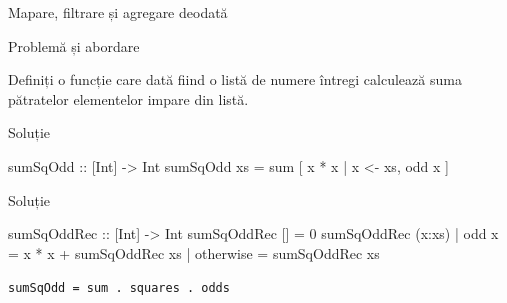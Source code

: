 \documentclass[handout,xcolor=pdftex,romanian,colorlinks]{beamer}
\begin{document}
\begin{section}{Mapare, filtrare și agregare deodată}
\end{section}
\begin{frame}[fragile]{Problemă și abordare}
\begin{block}{}
Definiți o funcție care dată fiind o listă de numere întregi calculează suma pătratelor elementelor impare din listă.
\end{block}
\begin{block}{Soluție }
\begin{asciihs}
sumSqOdd :: [Int] -> Int
sumSqOdd xs = sum [ x * x | x <- xs, odd x ]
\end{asciihs}
\end{block}
\begin{block}{Soluție }
\begin{asciihs}
sumSqOddRec :: [Int] -> Int
sumSqOddRec []                 = 0
sumSqOddRec (x:xs) | odd x     = x * x + sumSqOddRec xs
                   | otherwise = sumSqOddRec xs
\end{asciihs}
\end{block}
\hfill \lstinline$sumSqOdd = sum . squares . odds$

\end{frame}
\end{document}
